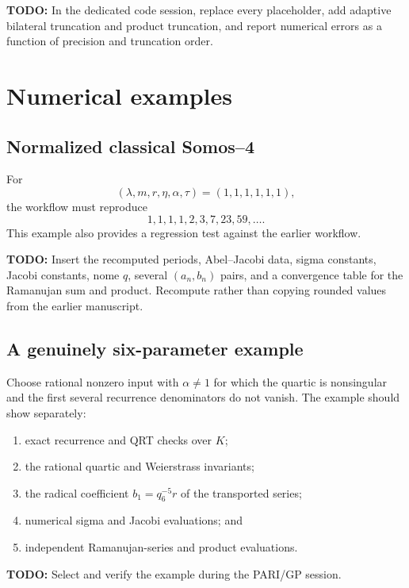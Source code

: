 \documentclass[11pt]{article}
\newcommand{\taupar}{\tau}
\newcommand{\TODO}[1]{\par\noindent\textcolor{red!70!black}{\textbf{TODO:} #1}\par}
\begin{document}
\TODO{In the dedicated code session, replace every placeholder, add adaptive
bilateral truncation and product truncation, and report numerical errors as a
function of precision and truncation order.}

\section{Numerical examples}
\subsection{Normalized classical Somos--4}
For
\[
 (\lambda,m,r,\eta,\alpha,\taupar)=(1,1,1,1,1,1),
\]
the workflow must reproduce
\[
 1,1,1,1,2,3,7,23,59,\ldots.
\]
This example also provides a regression test against the earlier workflow.

\TODO{Insert the recomputed periods, Abel--Jacobi data, sigma constants,
Jacobi constants, nome $q$, several $(a_n,b_n)$ pairs, and a convergence table
for the Ramanujan sum and product.  Recompute rather than copying rounded
values from the earlier manuscript.}

\subsection{A genuinely six-parameter example}
Choose rational nonzero input with $\alpha\ne1$ for which the quartic is
nonsingular and the first several recurrence denominators do not vanish.
The example should show separately:
\begin{enumerate}[leftmargin=2.3em]
 \item exact recurrence and QRT checks over $K$;
 \item the rational quartic and Weierstrass invariants;
 \item the radical coefficient $b_1=q_6^{-5}r$ of the transported series;
 \item numerical sigma and Jacobi evaluations; and
 \item independent Ramanujan-series and product evaluations.
\end{enumerate}

\TODO{Select and verify the example during the PARI/GP session.}
\end{document}
